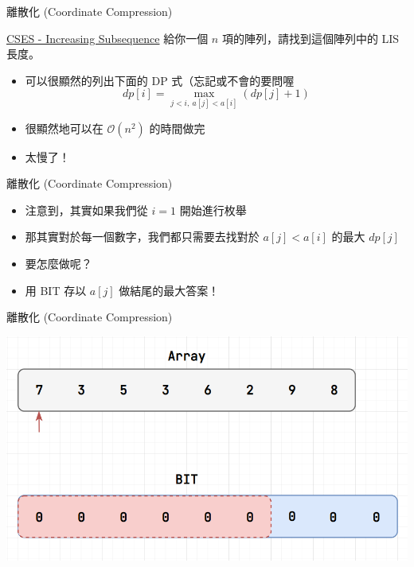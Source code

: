 \documentclass[aspectratio=169]{beamer}
\begin{document}
    \begin{frame}{離散化 (Coordinate Compression)}
        \begin{block}{\href{https://cses.fi/problemset/task/1145}{CSES - Increasing Subsequence}}
            給你一個 $n$ 項的陣列，請找到這個陣列中的 LIS 長度。
        \end{block}
        \begin{itemize}
            \item<2-> 可以很顯然的列出下面的 DP 式（忘記或不會的要問喔
            $$dp[i] = \max_{j < i, \ a[j] < a[i]} (dp[j] + 1)$$
            \item<3-> 很顯然地可以在 $\mathcal{O}(n^2)$ 的時間做完 
            \item<4-> 太慢了！
        \end{itemize}
    \end{frame}

    \begin{frame}{離散化 (Coordinate Compression)}
        \begin{itemize}
            \item 注意到，其實如果我們從 $i = 1$ 開始進行枚舉
            \item 那其實對於每一個數字，我們都只需要去找對於 $a[j] < a[i]$ 的最大 $dp[j]$
            \item<2-> 要怎麼做呢？
            \item<3-> 用 BIT 存以 $a[j]$ 做結尾的最大答案！
        \end{itemize}
    \end{frame}

    \begin{frame}{離散化 (Coordinate Compression)}
        \begin{center}
            \includegraphics[scale=0.45]{LIS/step1.png}
        \end{center}
    \end{frame}
\end{document}
